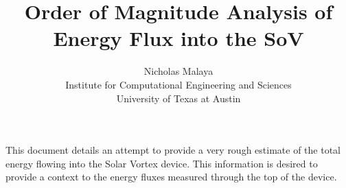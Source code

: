 \documentclass{article}
\title{\bf{Order of Magnitude Analysis of Energy Flux into the SoV}}
\author{Nicholas Malaya \\ Institute for Computational Engineering and Sciences \\ University of Texas at Austin} \date{}
\begin{document}
\maketitle

This document details an attempt to provide a very rough estimate of the total energy flowing into the Solar Vortex 
device. This information is desired to provide a context to the energy fluxes measured through the top of the 
device. 
\end{document}
